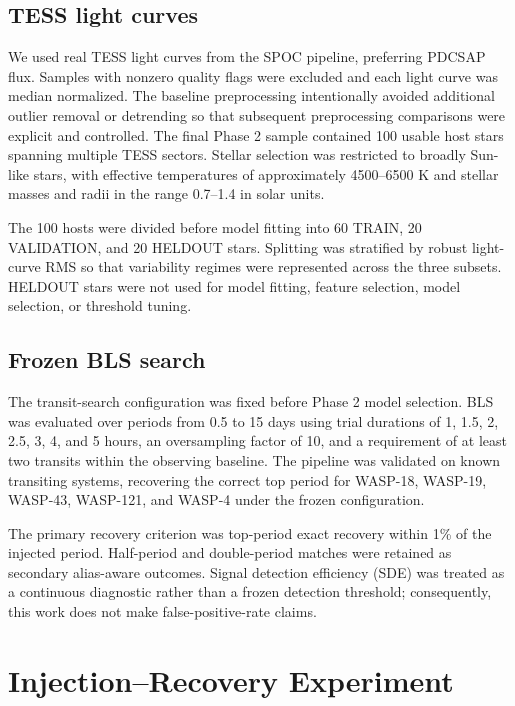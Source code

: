 \documentclass[10pt,twocolumn]{article}
\begin{document}
\subsection{TESS light curves}

We used real TESS light curves from the SPOC pipeline, preferring PDCSAP flux. Samples with nonzero quality flags were excluded and each light curve was median normalized. The baseline preprocessing intentionally avoided additional outlier removal or detrending so that subsequent preprocessing comparisons were explicit and controlled. The final Phase 2 sample contained 100 usable host stars spanning multiple TESS sectors. Stellar selection was restricted to broadly Sun-like stars, with effective temperatures of approximately 4500--6500 K and stellar masses and radii in the range 0.7--1.4 in solar units.

The 100 hosts were divided before model fitting into 60 TRAIN, 20 VALIDATION, and 20 HELDOUT stars. Splitting was stratified by robust light-curve RMS so that variability regimes were represented across the three subsets. HELDOUT stars were not used for model fitting, feature selection, model selection, or threshold tuning.

\subsection{Frozen BLS search}

The transit-search configuration was fixed before Phase 2 model selection. BLS was evaluated over periods from 0.5 to 15 days using trial durations of 1, 1.5, 2, 2.5, 3, 4, and 5 hours, an oversampling factor of 10, and a requirement of at least two transits within the observing baseline. The pipeline was validated on known transiting systems, recovering the correct top period for WASP-18, WASP-19, WASP-43, WASP-121, and WASP-4 under the frozen configuration.

The primary recovery criterion was top-period exact recovery within 1\% of the injected period. Half-period and double-period matches were retained as secondary alias-aware outcomes. Signal detection efficiency (SDE) was treated as a continuous diagnostic rather than a frozen detection threshold; consequently, this work does not make false-positive-rate claims.

\section{Injection--Recovery Experiment}
\end{document}
